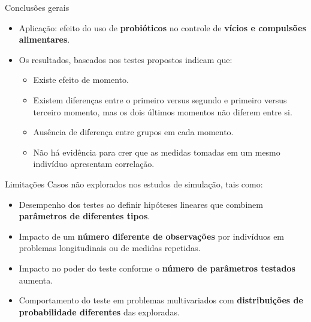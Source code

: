 \documentclass[
  ignorenonframetext,
  serif,
  professionalfont,
  usenames,
  dvipsnames,
  aspectratio = 169]{beamer}
\begin{document}
\begin{frame}{Conclusões gerais}
\protect\hypertarget{conclusuxf5es-gerais-1}{}
\begin{itemize}
  \itemsep 2ex
  
  \item Aplicação: efeito do uso de \textbf{probióticos} no controle de \textbf{vícios e compulsões alimentares}.

  \item Os resultados, baseados nos testes propostos indicam que: 
  \begin{itemize}
    \item Existe efeito de momento.
    \item Existem diferenças entre o primeiro versus segundo e primeiro versus terceiro momento, mas os dois últimos momentos não diferem entre si.
    \item Ausência de diferença entre grupos em cada momento.
    \item Não há evidência para crer que as medidas tomadas em um mesmo indivíduo apresentam correlação.
  \end{itemize}
\end{itemize}
\end{frame}

\begin{frame}{Limitações}
\protect\hypertarget{limitauxe7uxf5es}{}
Casos não explorados nos estudos de simulação, tais como:

\begin{itemize}
  \itemsep 2ex
  
  \item Desempenho dos testes ao definir hipóteses lineares que combinem \textbf{parâmetros de diferentes tipos}.
  \item Impacto de um \textbf{número diferente de observações} por indivíduos em problemas longitudinais ou de medidas repetidas. 
  \item Impacto no poder do teste conforme o \textbf{número de parâmetros testados} aumenta.
  \item Comportamento do teste em problemas multivariados com \textbf{distribuições de probabilidade diferentes} das exploradas.

\end{itemize}
\end{frame}
\end{document}
